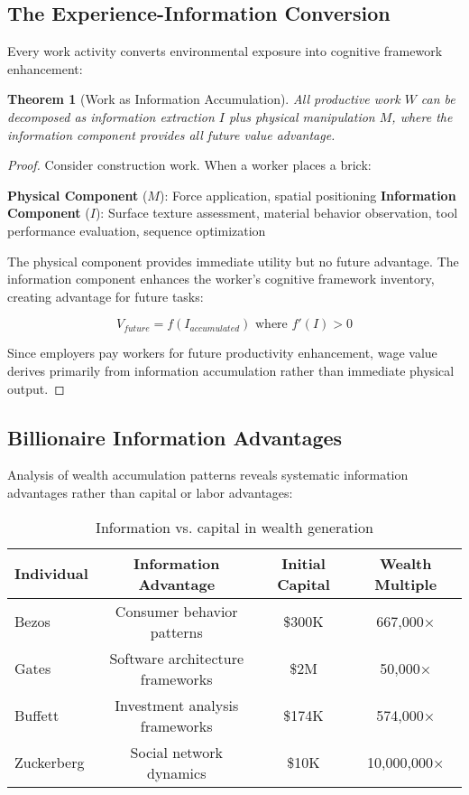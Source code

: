 \documentclass[12pt,a4paper]{article}
\newtheorem{theorem}{Theorem}
\begin{document}
\subsection{The Experience-Information Conversion}

Every work activity converts environmental exposure into cognitive framework enhancement:

\begin{theorem}[Work as Information Accumulation]
All productive work $W$ can be decomposed as information extraction $I$ plus physical manipulation $M$, where the information component provides all future value advantage.
\end{theorem}

\begin{proof}
Consider construction work. When a worker places a brick:

\textbf{Physical Component} ($M$): Force application, spatial positioning
\textbf{Information Component} ($I$): Surface texture assessment, material behavior observation, tool performance evaluation, sequence optimization

The physical component provides immediate utility but no future advantage. The information component enhances the worker's cognitive framework inventory, creating advantage for future tasks:

$$V_{future} = f(I_{accumulated}) \text{ where } f'(I) > 0$$

Since employers pay workers for future productivity enhancement, wage value derives primarily from information accumulation rather than immediate physical output.
\end{proof}

\subsection{Billionaire Information Advantages}

Analysis of wealth accumulation patterns reveals systematic information advantages rather than capital or labor advantages:

\begin{table}[H]
\centering
\begin{tabular}{lccc}
\toprule
\textbf{Individual} & \textbf{Information Advantage} & \textbf{Initial Capital} & \textbf{Wealth Multiple} \\
\midrule
Bezos & Consumer behavior patterns & \$300K & 667,000× \\
Gates & Software architecture frameworks & \$2M & 50,000× \\
Buffett & Investment analysis frameworks & \$174K & 574,000× \\
Zuckerberg & Social network dynamics & \$10K & 10,000,000× \\
\bottomrule
\end{tabular}
\caption{Information vs. capital in wealth generation}
\end{table}
\end{document}
